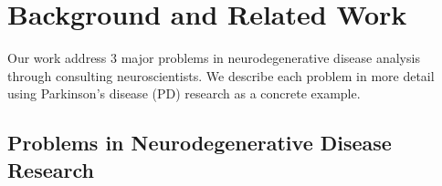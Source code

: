 
\section{Background and Related Work}
\label{sec:backgroundAndRelatedWork}



\noindent Our work address 3 major problems in %
neurodegenerative disease analysis through consulting neuroscientists. We describe each problem in more detail using Parkinson's disease (PD) research as a concrete example.


\subsection{Problems in Neurodegenerative Disease Research}
\label{sec:problems}

